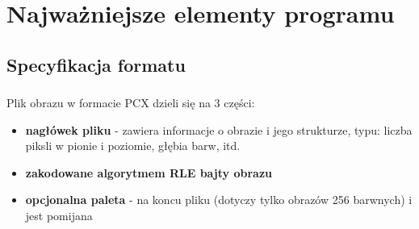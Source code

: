 \documentclass{article}
\begin{document}
\section{Najważniejsze elementy programu}


\subsection{Specyfikacja formatu}
\subsubsection{}
Plik obrazu w formacie PCX dzieli się na 3 części:
\begin{itemize}
\item \textbf{nagłówek pliku} - zawiera informacje o obrazie i jego strukturze, typu: liczba piksli w pionie i poziomie, głębia barw, itd.
\item \textbf{zakodowane algorytmem RLE bajty obrazu} 
\item \textbf{opcjonalna paleta} - na koncu pliku (dotyczy tylko obrazów 256 barwnych) i jest pomijana
\end{itemize}
\end{document}
